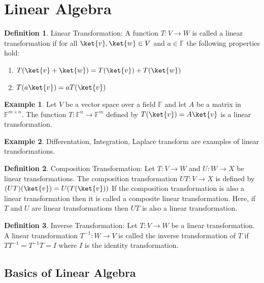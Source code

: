 \documentclass[12pt, oneside]{book}
\theoremstyle{definition}
\newtheorem{definition}{Definition}[section]
\theoremstyle{definition}
\newtheorem{example}{Example}[section]
\theoremstyle{remark}
\begin{document}
\section{Linear Algebra}

\begin{definition}
    Linear Transformation: A function $T:V\rightarrow W$ is called a linear transformation if for all $\ket{v},\ket{w}\in V$ and $a\in\mathbb{F}$ the following properties hold:
    \begin{enumerate}
        \item $T(\ket{v}+\ket{w})=T(\ket{v})+T(\ket{w})$
        \item $T(a\ket{v})=aT(\ket{v})$
    \end{enumerate}
\end{definition}

\begin{example}
    Let $V$ be a vector space over a field $\mathbb{F}$ and let $A$ be a matrix in $\mathbb{F}^{m\times n}$. The function $T:\mathbb{F}^{n}\rightarrow\mathbb{F}^{m}$ defined by $T(\ket{v})=A\ket{v}$ is a linear transformation.
\end{example}

\begin{example}
    Differentation, Integration, Laplace transform are examples of linear transformations.
\end{example}

\begin{definition}
    Composition Transformation: Let $T:V\rightarrow W$ and $U:W\rightarrow X$ be linear transformations. The composition transformation $UT:V\rightarrow X$ is defined by $(UT)(\ket{v})=U(T(\ket{v}))$
    If the composition transformation is also a linear transformation then it is called a composite linear transformation. Here, if $T$ and $U$ are linear transformations then $UT$ is also a linear transformation.
\end{definition}

\begin{definition}
    Inverse Transformation: Let $T:V\rightarrow W$ be a linear transformation. A linear transformation $T^{-1}:W\rightarrow V$ is called the inverse transformation of $T$ if $TT^{-1}=T^{-1}T=I$ where $I$ is the identity transformation.
\end{definition}


\subsection{Basics of Linear Algebra}
\end{document}
